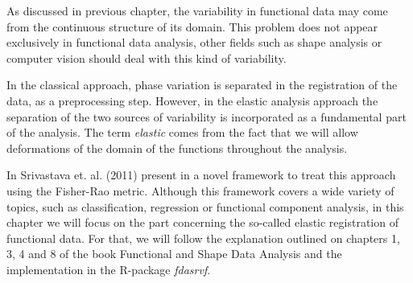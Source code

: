 As discussed in previous chapter, the variability in functional data may come
from the continuous structure of its domain. This problem does not appear
exclusively in functional data analysis, other fields such as shape analysis or
computer vision should deal with this kind of variability.

In the classical approach, phase variation is separated in the registration of
the data, as a preprocessing step. However, in the elastic analysis approach the
separation of the two sources of variability is incorporated as a fundamental
part of the analysis. The term \textit{elastic} comes from the fact that we will allow
deformations of the domain of the functions throughout the analysis.

In Srivastava et. al. (2011) present in \cite{Srivastava2011} a novel
framework to treat this approach using the Fisher-Rao metric. Although this
framework covers a wide variety of topics, such as classification, regression or
functional component analysis\cite{Tucker2014}, in this chapter we will focus
on the part concerning the so-called elastic registration of functional data.
For that, we will follow the explanation outlined on chapters 1, 3, 4 and 8 of
the book Functional and Shape Data Analysis \cite{Srivastava2016} and
the implementation in the R-package \textit{fdasrvf}\cite{fdasrvf}.
